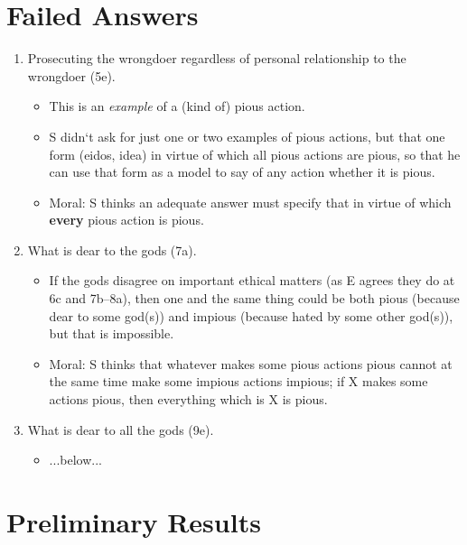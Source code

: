 \documentclass[oneside]{article}
\begin{document}
\section*{Failed Answers}
\begin{enumerate}
\item Prosecuting the wrongdoer regardless of personal relationship to the wrongdoer (5e).

\begin{itemize}\item{This is an \emph{example} of a (kind of) pious action.}
\item S didn`t ask for just one or two examples of pious  actions, but that one form (eidos, idea) in virtue of which all pious actions are pious, so that he can use that form as a model to say of any action whether it is pious.

\item{Moral: S thinks an adequate answer must specify that in virtue of which \textbf{every} pious action is pious.}\end{itemize}

\item{What is dear to the gods (7a).}

\begin{itemize}\item{If the gods disagree on important ethical matters (as E agrees they do at 6c and 7b--8a), then one and the same thing could be both pious (because dear to some god(s)) and impious (because hated by some other god(s)), but that is impossible.}
\item{Moral: S thinks that whatever makes some pious actions pious cannot at the same time make some impious actions impious; if X makes some actions pious, then everything which is X is pious.}\end{itemize}

\item What is dear to all the gods (9e).
\begin{itemize}
\item...below...
\end{itemize}
\end{enumerate}

\section*{Preliminary Results}
\end{document}
